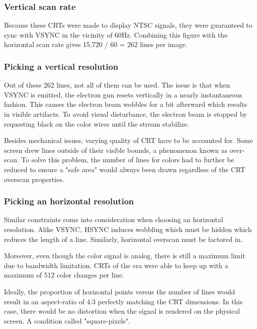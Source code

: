 \subsubsection{Vertical scan rate}
Because these CRTs were made to display NTSC signals, they were guaranteed to sync with VSYNC in the vicinity of 60Hz. Combining this figure with the horizontal scan rate gives 15,720 / 60 = 262 lines per image.


\subsubsection{Picking a vertical resolution}
Out of these 262 lines, not all of them can be used. The issue is that when VSYNC is emitted, the electron gun resets vertically in a nearly instantaneous fashion. This causes the electron beam wobbles for a bit afterward which results in visible artifacts. To avoid visual disturbance, the electron beam is stopped by requesting black on the color wires until the stream stabilize. 

Besides mechanical issues, varying quality of CRT have to be accounted for. Some screen drew lines outside of their visible bounds, a phenomenon known as over-scan. To solve this problem, the number of lines for colors had to further be reduced to ensure a "safe area" would always been drawn regardless of the CRT overscan properties.



\subsubsection{Picking an horizontal resolution}
Similar constraints come into consideration when choosing an horizontal resolution. Alike VSYNC, HSYNC induces wobbling which must be hidden which reduces the length of a line. Similarly, horizontal overscan must be factored in.

Moreover, even though the color signal is analog, there is still a maximum limit due to bandwidth limitation. CRTs of the era were able to keep up with a maximum of 512 color changes per line.

Ideally, the proportion of horizontal points versus the number of lines would result in an aspect-ratio of 4:3 perfectly matching the CRT dimensions. In this case, there would be no distortion when the signal is rendered on the physical screen. A condition called "square-pixels". 


